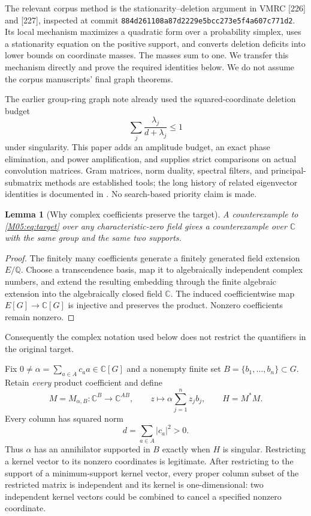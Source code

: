 \documentclass[11pt,a4paper,oneside]{report}
\newtheorem{lemma}[theorem]{Lemma}
\theoremstyle{definition}
\theoremstyle{remark}
\newcommand{\C}{\mathbb C}
\newcommand{\Q}{\mathbb Q}
\begin{document}
The relevant corpus method is the stationarity--deletion argument
in VMRC [226] and [227], inspected at commit
\texttt{884d261108a87d2229e5bcc273e5f4a607c771d2}.
Its local mechanism maximizes a quadratic form over a probability
simplex, uses a stationarity equation on the positive support, and
converts deletion deficits into lower bounds on coordinate masses.
The masses sum to one. We transfer this mechanism directly and
prove the required identities below. We do not assume the corpus
manuscripts' final graph theorems.

The earlier group-ring graph note \cite{B:InternalGraph} already used the
squared-coordinate deletion budget
\[
 \sum_j\frac{\lambda_j}{d+\lambda_j}\le1
\]
under singularity. This paper adds an amplitude budget, an exact
phase elimination, and power amplification, and supplies strict
comparisons on actual convolution matrices. Gram matrices, norm
duality, spectral filters, and principal-submatrix methods are
established tools; the long history of related eigenvector identities
is documented in \cite{B:DPTZ}. No search-based priority claim is made.

\begin{lemma}[Why complex coefficients preserve the target]\label{M05:lem:complex}
A counterexample to \eqref{M05:eq:target} over any characteristic-zero
field gives a counterexample over $\C$ with the same group and the
same two supports.
\end{lemma}
\begin{proof}
The finitely many coefficients generate a finitely generated field
extension $E/\Q$. Choose a transcendence basis, map it to algebraically
independent complex numbers, and extend the resulting embedding
through the finite algebraic extension into the algebraically closed
field $\C$. The induced coefficientwise map $E[G]\to\C[G]$ is
injective and preserves the product. Nonzero coefficients remain
nonzero.
\end{proof}
Consequently the complex notation used below does not restrict the
quantifiers in the original target.

Fix $0\ne\alpha=\sum_{a\in A}c_a a\in\C[G]$ and a nonempty finite
set $B=\{b_1,\ldots,b_n\}\subset G$. Retain \emph{every} product
coefficient and define
\begin{equation}\label{M05:eq:matrix}
 M=M_{\alpha,B}:\C^B\longrightarrow\C^{AB},\qquad
 z\longmapsto\alpha\sum_{j=1}^n z_jb_j,\qquad H=M^*M.
\end{equation}
Every column has squared norm
\[
 d=\sum_{a\in A}|c_a|^2>0.
\]
Thus $\alpha$ has an annihilator supported in $B$ exactly when $H$
is singular. Restricting a kernel vector to its nonzero coordinates
is legitimate. After restricting to the support of a minimum-support
kernel vector, every proper column subset of the restricted matrix
is independent and its kernel is one-dimensional: two independent
kernel vectors could be combined to cancel a specified nonzero coordinate.
\end{document}
